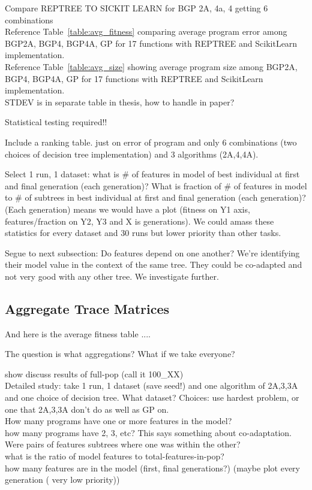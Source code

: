 Compare REPTREE TO SICKIT LEARN for BGP 2A, 4a, 4 getting 6 combinations\\
Reference Table~\ref{table:avg_fitness} comparing average program error among BGP2A, BGP4, BGP4A, GP for 17 functions with REPTREE and ScikitLearn implementation.\\
Reference Table~\ref{table:avg_size} showing average program size among BGP2A, BGP4, BGP4A, GP for 17 functions with REPTREE and ScikitLearn implementation.\\
STDEV is in separate table in thesis, how to handle in paper?

Statistical testing required!!

Include a ranking table.  just on error of program and only 6 combinations (two choices of decision tree implementation) and 3 algorithms (2A,4,4A). 

Select 1 run, 1 dataset: what is \# of features in model of best individual at first and final generation (each generation)? What is fraction of \# of features in model to \# of subtrees in best individual at first and final generation (each generation)?  (Each generation) means we would have a plot (fitness on Y1 axis, features/fraction on Y2, Y3 and X is generations). We could amass these statistics for every dataset and 30 runs but lower priority than other tasks.

Segue to next subsection: Do features depend on one another? We're identifying their model value in the context of the same tree. They could be co-adapted and not very good with any other tree. We investigate further.

\subsection{Aggregate Trace Matrices}\label{sect:agg-features}


%

And here is the average fitness table ....






The question is what aggregations? What if we take everyone?

show discuss results of full-pop (call it 100\_XX)\\

Detailed study: take 1 run, 1 dataset (save seed!) and one algorithm of 2A,3,3A and one choice of decision tree.  What dataset? Choices: use hardest problem, or one that 2A,3,3A don't do as well as GP on. \\
How many programs have one or more features in the model?\\ how many programs have 2, 3, etc? This says something about co-adaptation. Were pairs of features subtrees where one was within the other?  \\what is the ratio of model features to total-features-in-pop? \\how many features are in the model (first, final generations?) (maybe plot every generation ( very low priority))


